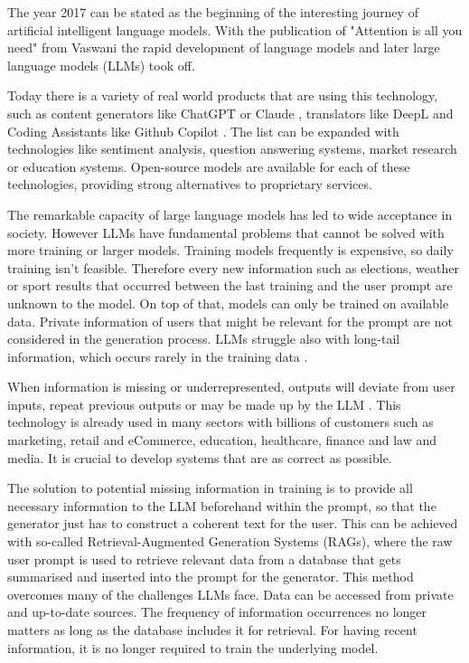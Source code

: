 The year 2017 can be stated as the beginning of the interesting journey of artificial intelligent language models. With the publication of "Attention is all you need" from Vaswani \cite{vaswani2023attentionneed} the rapid development of language models and later large language models (LLMs) took off.

Today there is a variety of real world products that are using this technology, such as content generators like ChatGPT \cite{OpenAI_2022} or Claude \cite{Anthropic_2023}, translators like DeepL \cite{DeepL_SE} and Coding Assistants like Github Copilot \cite{Friedman_2022}. The list can be expanded with technologies like sentiment analysis, question answering systems, market research or education systems. Open-source models are available for each of these technologies, providing strong alternatives to proprietary services.

The remarkable capacity of large language models has led to wide acceptance in society. However LLMs have fundamental problems that cannot be solved with more training or larger models. Training models frequently is expensive, so daily training isn't feasible. Therefore every new information such as elections, weather or sport results that occurred between the last training and the user prompt are unknown to the model. On top of that, models can only be trained on available data. Private information of users that might be relevant for the prompt are not considered in the generation process. LLMs struggle also with long-tail information, which occurs rarely in the training data \cite{Kandpal.15.11.2022}.

When information is missing or underrepresented, outputs will deviate from user inputs, repeat previous outputs or may be made up by the LLM \cite{Zhang.03.09.2023}. This technology is already used in many sectors with billions of customers such as marketing, retail and eCommerce, education, healthcare, finance and law and media. It is crucial to develop systems that are as correct as possible.

The solution to potential missing information in training is to provide all necessary information to the LLM beforehand within the prompt, so that the generator just has to construct a coherent text for the user. This can be achieved with so-called Retrieval-Augmented Generation Systems (RAGs), where the raw user prompt is used to retrieve relevant data from a database that gets summarised and inserted into the prompt for the generator. This method overcomes many of the challenges LLMs face. Data can be accessed from private and up-to-date sources. The frequency of information occurrences no longer matters as long as the database includes it for retrieval. For having recent information, it is no longer required to train the underlying model.

